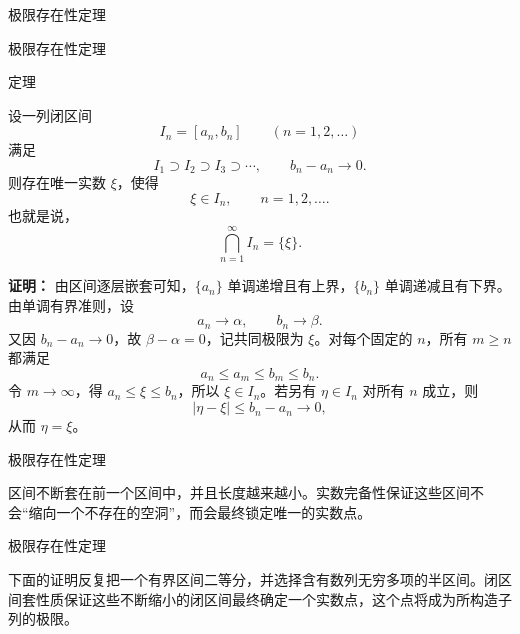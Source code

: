 \documentclass[aspectratio=169,10pt,fontset=fandol]{ctexbeamer}
\begin{document}
\begin{frame}[t,fragile]{极限存在性定理}
\small
{\small



\iffalse


}
\end{frame}
\begin{frame}[t,fragile]{极限存在性定理}
\small
\begin{block}{定理}
{\small

设一列闭区间
\[
I_n=[a_n,b_n]\qquad(n=1,2,\ldots)
\]
满足
\[
I_1\supset I_2\supset I_3\supset\cdots,
\qquad b_n-a_n\to0.
\]
则存在唯一实数 \(\xi\)，使得
\[
\xi\in I_n,\qquad n=1,2,\ldots.
\]
也就是说，
\[
\bigcap_{n=1}^{\infty}I_n=\{\xi\}.
\]

}
\end{block}
\pause
{\small
\textbf{证明：}
由区间逐层嵌套可知，\(\{a_n\}\) 单调递增且有上界，\(\{b_n\}\) 单调递减且有下界。由单调有界准则，设
\[
a_n\to\alpha,\qquad b_n\to\beta.
\]
又因 \(b_n-a_n\to0\)，故 \(\beta-\alpha=0\)，记共同极限为 \(\xi\)。对每个固定的 \(n\)，所有 \(m\ge n\) 都满足
\[
a_n\le a_m\le b_m\le b_n.
\]
令 \(m\to\infty\)，得 \(a_n\le\xi\le b_n\)，所以 \(\xi\in I_n\)。若另有 \(\eta\in I_n\) 对所有 \(n\) 成立，则
\[
|\eta-\xi|\le b_n-a_n\to0,
\]
从而 \(\eta=\xi\)。

}
\end{frame}
\begin{frame}[t,fragile]{极限存在性定理}
\small
{\small
区间不断套在前一个区间中，并且长度越来越小。实数完备性保证这些区间不会“缩向一个不存在的空洞”，而会最终锁定唯一的实数点。
\begin{center}
\end{center}

}
\end{frame}
\begin{frame}[t,fragile]{极限存在性定理}
\small
{\small


下面的证明反复把一个有界区间二等分，并选择含有数列无穷多项的半区间。闭区间套性质保证这些不断缩小的闭区间最终确定一个实数点，这个点将成为所构造子列的极限。


}
\end{frame}
\end{document}
